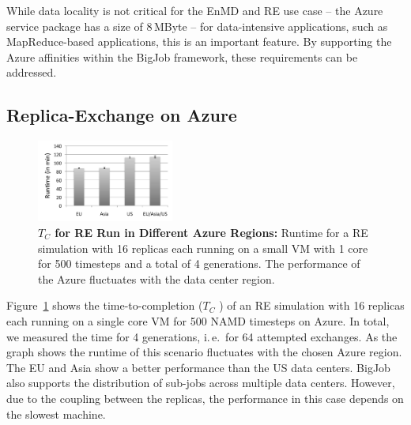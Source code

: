 \documentclass[conference,final]{IEEEtran}
\newcommand{\up}{\vspace*{-1em}}
\newcommand{\tc}{$T_{C}$ }
\newcommand{\jhanote}[1]{ {\textcolor{red} { ***SJ: #1 }}}
\newcommand{\jhanote}[1]{}
\begin{document}

While data locality is not critical for the EnMD and RE use case --
the Azure service package has a size of 8\,MByte -- for data-intensive
applications, such as MapReduce-based applications, this is an
important feature. By supporting the Azure affinities within the
BigJob framework, these requirements can be addressed.  \up

\subsection{Replica-Exchange on Azure}
\up
\begin{figure}[t]
    \centering
        \includegraphics[width=0.4\textwidth]{performance/repex_runtime_per_region.pdf}
        \up
        \caption{\textbf{\tc for RE Run in Different Azure Regions:}
          Runtime for a RE simulation with 16 replicas each running on
          a small VM with 1 core for 500 timesteps and a total of 4
          generations. The performance of the Azure fluctuates with
          the data center region.%
          \up}
    \label{fig:performance_repex_runtime_per_region}
    \up
\end{figure}

Figure~\ref{fig:performance_repex_runtime_per_region} shows the
time-to-completion (\tc) of an RE simulation with 16 replicas each
running on a single core VM for 500 NAMD timesteps on Azure. In total,
we measured the time for 4 generations, i.\,e.\ for 64 attempted
exchanges. As the graph shows the runtime of this scenario fluctuates
with the chosen Azure region. The EU and Asia show a better
performance than the US data centers. BigJob also supports the
distribution of sub-jobs across multiple data centers. However, due to
the coupling between the replicas, the performance in this case
depends on the slowest machine.
\end{document}
